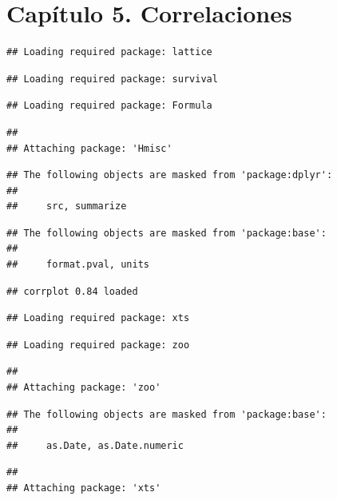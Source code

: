 \documentclass[
  11pt,
  a4paper,
]{book}
\begin{document}
\hypertarget{capuxedtulo-5.-correlaciones}{%
\chapter{Capítulo 5. Correlaciones}\label{capuxedtulo-5.-correlaciones}}

\begin{verbatim}
## Loading required package: lattice
\end{verbatim}

\begin{verbatim}
## Loading required package: survival
\end{verbatim}

\begin{verbatim}
## Loading required package: Formula
\end{verbatim}

\begin{verbatim}
## 
## Attaching package: 'Hmisc'
\end{verbatim}

\begin{verbatim}
## The following objects are masked from 'package:dplyr':
## 
##     src, summarize
\end{verbatim}

\begin{verbatim}
## The following objects are masked from 'package:base':
## 
##     format.pval, units
\end{verbatim}

\begin{verbatim}
## corrplot 0.84 loaded
\end{verbatim}

\begin{verbatim}
## Loading required package: xts
\end{verbatim}

\begin{verbatim}
## Loading required package: zoo
\end{verbatim}

\begin{verbatim}
## 
## Attaching package: 'zoo'
\end{verbatim}

\begin{verbatim}
## The following objects are masked from 'package:base':
## 
##     as.Date, as.Date.numeric
\end{verbatim}

\begin{verbatim}
## 
## Attaching package: 'xts'
\end{verbatim}
\end{document}
